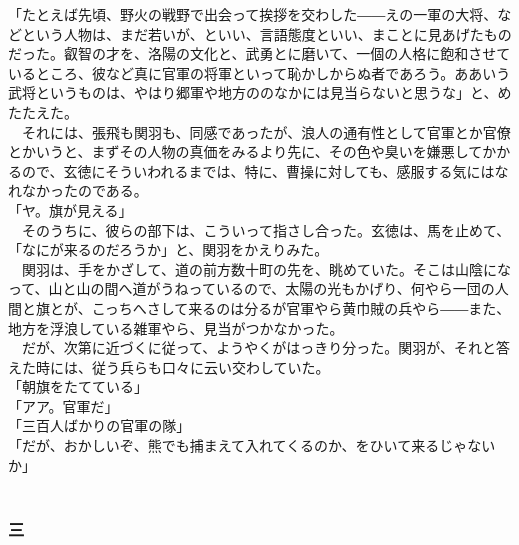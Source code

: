 \documentclass[
  paper=a5,
  fontsize=10pt,
  jafontsize=9.5pt,
  tate,                  %
  open_bracket_pos=nibu, %
]{jlreq}
\begin{document}
「たとえば先頃、野火の戦野で出会って挨拶を交わした――えの一軍の大将、などという人物は、まだ若いが、といい、言語態度といい、まことに見あげたものだった。叡智の才を、洛陽の文化と、武勇とに磨いて、一個の人格に飽和させているところ、彼など真に官軍の将軍といって恥かしからぬ者であろう。ああいう武将というものは、やはり郷軍や地方ののなかには見当らないと思うな」と、めたたえた。\\


　それには、張飛も関羽も、同感であったが、浪人の通有性として官軍とか官僚とかいうと、まずその人物の真価をみるより先に、その色や臭いを嫌悪してかかるので、玄徳にそういわれるまでは、特に、曹操に対しても、感服する気にはなれなかったのである。\\


「ヤ。旗が見える」\\


　そのうちに、彼らの部下は、こういって指さし合った。玄徳は、馬を止めて、\\


「なにが来るのだろうか」と、関羽をかえりみた。\\


　関羽は、手をかざして、道の前方数十町の先を、眺めていた。そこは山陰になって、山と山の間へ道がうねっているので、太陽の光もかげり、何やら一団の人間と旗とが、こっちへさして来るのは分るが官軍やら黄巾賊の兵やら――また、地方を浮浪している雑軍やら、見当がつかなかった。\\


　だが、次第に近づくに従って、ようやくがはっきり分った。関羽が、それと答えた時には、従う兵らも口々に云い交わしていた。\\


「朝旗をたてている」\\


「アア。官軍だ」\\


「三百人ばかりの官軍の隊」\\


「だが、おかしいぞ、熊でも捕まえて入れてくるのか、をひいて来るじゃないか」\\

\\

\subsubsection{三}
\end{document}
